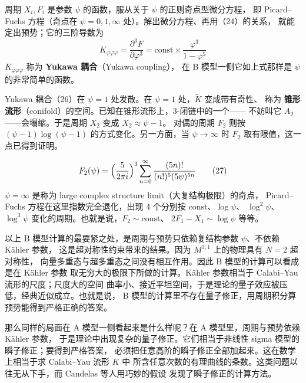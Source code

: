 
周期 $X_i,F_i$ 是参数 $\psi$ 的函数，服从关于 $\psi$ 的正则奇点型微分方程，
即 Picard--Fuchs 方程（奇点在 $\psi=0,1,\infty$ 处）。解出微分方程、再用（24）的关系，
就能定出预势；它的三阶导数为
\begin{equation}
  K_{\varphi\varphi\varphi}=\frac{\partial^3 F}{\partial\varphi^3}
  =\mathrm{const}\times\frac{\varphi^3}{1-\varphi^5} \tag{26}
\end{equation}
$K_{\varphi\varphi\varphi}$ 称为 \textbf{Yukawa 耦合}（Yukawa coupling），
在 B 模型一侧它如上式那样是 $\psi$ 的非常简单的函数。

Yukawa 耦合（26）在 $\psi=1$ 处发散。在 $\psi=1$ 处，$\tilde K$ 变成带有奇性、
称为 \textbf{锥形流形}（conifold）的空间。已知在锥形流形上，3-闭链中的一个——
不妨叫它 $A_2$——会塌缩。于是周期 $X_2$ 变成 $X_2\approx\psi-1$。
对偶的周期 $F_2$ 则按 $(\psi-1)\log(\psi-1)$ 的方式变化。另一方面，当
$\psi\to\infty$ 时 $F_2$ 取有限值，这一点已得到证明。

\begin{equation}
  F_2(\psi)=\Bigl(\frac{5}{2\pi i}\Bigr)^3
  \sum_{n=0}^{\infty}\frac{(5n)!}{(n!)^5(5\psi)^{5n}} \tag{27}
\end{equation}
$\psi=\infty$ 是称为 large complex structure limit（大复结构极限）的奇点，
Picard--Fuchs 方程在这里指数完全退化，出现 4 个分别按 $\mathrm{const}$、$\log\psi$、
$\log^2\psi$、$\log^3\psi$ 变化的周期。也就是说，$F_2\sim\mathrm{const}$、
$2F_1-X_1\sim\log\psi$ 等等。

以上 B 模型计算的最要紧之处，是周期与预势只依赖复结构参数 $\psi$、不依赖 Kähler 参数，
这是超对称性约束带来的结果。因为 $M^{3,1}$ 上的物理具有 $N=2$ 超对称性，
向量多重态与超多重态之间没有相互作用。因此 B 模型的计算可以看成是在 Kähler 参数
取无穷大的极限下所做的计算。Kähler 参数相当于 Calabi--Yau 流形的尺度；尺度大的空间
曲率小、接近平坦空间，于是理论的量子效应被压低，经典近似成立。也就是说，
B 模型的计算里不存在量子修正，用周期积分算预势能得到严格正确的答案。

那么同样的局面在 A 模型一侧看起来是什么样呢？在 A 模型里，周期与预势依赖 Kähler 参数，
于是理论中出现复杂的量子修正。它们相当于非线性 sigma 模型的瞬子修正；要得到严格答案，
必须把任意高阶的瞬子修正全部加起来。这在数学上相当于求 Calabi--Yau 流形 $K$ 中
所含任意次数的有理曲线的条数。这类问题以往无从下手，而 Candelas 等人用巧妙的假设
发现了瞬子修正的计算方法。

